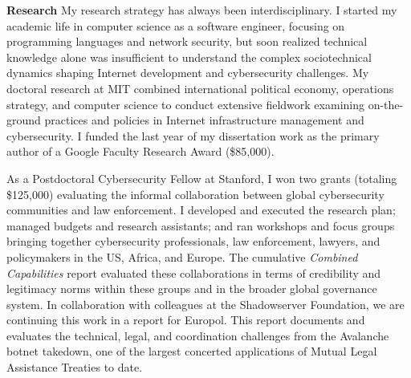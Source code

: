 \documentclass[11pt]{letter}
\begin{document}
\begin{letter}
\textbf{Research} \vspace{0.2 \baselineskip} \newline %
%
My research strategy has always been interdisciplinary. 
%
I started my academic life in computer science as a software engineer, focusing on programming languages and network security, but soon realized technical knowledge alone was insufficient to understand the complex sociotechnical dynamics shaping Internet development and cybersecurity challenges.
My doctoral research at MIT combined international political economy, operations strategy, and computer science to conduct extensive fieldwork examining on-the-ground practices and policies in Internet infrastructure management and cybersecurity.
%
I funded the last year of my dissertation work as the primary author of a Google Faculty Research Award (\$85,000). 
%

As a Postdoctoral Cybersecurity Fellow at Stanford, I won two grants (totaling \$125,000) evaluating the informal collaboration between global  cybersecurity communities and law enforcement.
%
%
I developed and executed the research plan; managed budgets and research assistants; and ran workshops and focus groups bringing together cybersecurity professionals, law enforcement, lawyers, and policymakers in the US, Africa, and Europe.
%
The cumulative \emph{Combined Capabilities} report evaluated these collaborations in terms of credibility and legitimacy norms within these groups and in the broader global governance system.
%
In collaboration with colleagues at the Shadowserver Foundation, we are continuing this work in a report for Europol.
%
This report documents and evaluates the technical, legal, and coordination challenges from the Avalanche botnet takedown, one of the largest concerted applications of Mutual Legal Assistance Treaties to date.


%


\end{letter}
\end{document}
